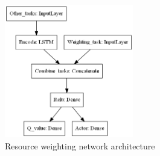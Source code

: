\begin{figure}
    \centering
    \includegraphics[width=0.5\textwidth]{figures/3_solution_figs/resource_weighting_network_architecture.png}
    \caption{Resource weighting network architecture}
    \label{fig:resource_weighting_network_architecture}
\end{figure}


